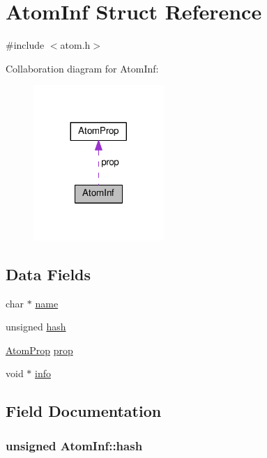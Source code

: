 \hypertarget{structAtomInf}{}\section{Atom\+Inf Struct Reference}
\label{structAtomInf}


{\ttfamily \#include $<$atom.\+h$>$}



Collaboration diagram for Atom\+Inf\+:\nopagebreak
\begin{figure}[H]
\begin{center}
\leavevmode
\includegraphics[width=140pt]{structAtomInf__coll__graph}
\end{center}
\end{figure}
\subsection*{Data Fields}
\begin{DoxyCompactItemize}
\item 
char $\ast$ \hyperlink{structAtomInf_a2e8fbcd0d525d43b562f771d099e694e}{name}
\item 
unsigned \hyperlink{structAtomInf_aa2294890b36422410177f1ac258c5157}{hash}
\item 
\hyperlink{structAtomProp}{Atom\+Prop} \hyperlink{structAtomInf_a649620e4716f966372c391e2e8e5245d}{prop}
\item 
void $\ast$ \hyperlink{structAtomInf_a497dcae4cea5b3a779731b97476d05a5}{info}
\end{DoxyCompactItemize}


\subsection{Field Documentation}
\subsubsection[{\texorpdfstring{hash}{hash}}]{\setlength{\rightskip}{0pt plus 5cm}unsigned Atom\+Inf\+::hash}\hypertarget{structAtomInf_aa2294890b36422410177f1ac258c5157}{}\label{structAtomInf_aa2294890b36422410177f1ac258c5157}
